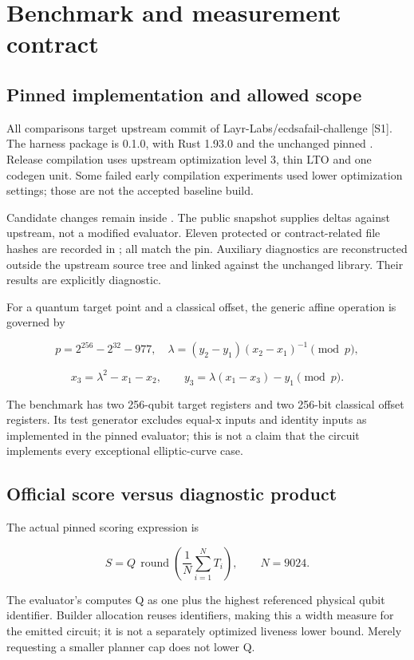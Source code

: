 \documentclass[11pt,letterpaper]{article}
\begin{document}
\section{Benchmark and measurement contract}

\subsection{Pinned implementation and allowed scope}

All comparisons target upstream commit  of Layr-Labs/ecdsafail-challenge [S1]. The harness package is  0.1.0, with Rust 1.93.0 and the unchanged pinned . Release compilation uses upstream optimization level 3, thin LTO and one codegen unit. Some failed early compilation experiments used lower optimization settings; those are not the accepted baseline build.


Candidate changes remain inside . The public snapshot supplies deltas against upstream, not a modified evaluator. Eleven protected or contract-related file hashes are recorded in ; all match the pin. Auxiliary diagnostics are reconstructed outside the upstream source tree and linked against the unchanged library. Their results are explicitly diagnostic.


For a quantum target point and a classical offset, the generic affine operation is governed by


\[
p=2^{256}-2^{32}-977,\quad
\lambda=(y_2-y_1)(x_2-x_1)^{-1}\pmod p,
\]

\[
x_3=\lambda^2-x_1-x_2,\qquad y_3=\lambda(x_1-x_3)-y_1\pmod p.
\]

The benchmark has two 256-qubit target registers and two 256-bit classical offset registers. Its test generator excludes equal-x inputs and identity inputs as implemented in the pinned evaluator; this is not a claim that the circuit implements every exceptional elliptic-curve case.


\subsection{Official score versus diagnostic product}

The actual pinned scoring expression is


\[
S=Q\,\operatorname{round}\!\left(\frac{1}{N}\sum_{i=1}^{N}T_i\right),\qquad N=9024.
\]

The evaluator's  computes Q as one plus the highest referenced physical qubit identifier. Builder allocation reuses identifiers, making this a width measure for the emitted circuit; it is not a separately optimized liveness lower bound. Merely requesting a smaller planner cap does not lower Q.
\end{document}
